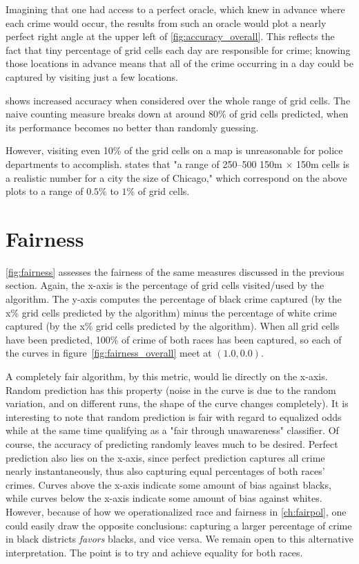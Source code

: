 Imagining that one had access to a perfect oracle, which knew in advance where each crime would occur, the results from such an oracle would plot a nearly perfect right angle at the upper left of \autoref{fig:accuracy_overall}. This reflects the fact that tiny percentage of grid cells each day are responsible for crime; knowing those locations in advance means that all of the crime occurring in a day could be captured by visiting just a few locations.

\pp shows increased accuracy when considered over the whole range of grid cells. The naive counting measure breaks down at around 80\% of grid cells predicted, when its performance becomes no better than randomly guessing.

However, visiting even 10\% of the grid cells on a map is unreasonable for police departments to accomplish. \citet{mohler_marked_2014} states that "a range of 250–500 150m $\times$ 150m cells is a realistic number for a city the size of Chicago," which correspond on the above plots to a range of $0.5\%$ to $1\%$ of grid cells.

\section{Fairness}
\autoref{fig:fairness} assesses the fairness of the same measures discussed in the previous section. Again, the x-axis is the percentage of grid cells visited/used by the algorithm. The y-axis computes the percentage of black crime captured (by the x\% grid cells predicted by the algorithm) minus the percentage of white crime captured (by the x\% grid cells predicted by the algorithm). When all grid cells have been predicted, 100\% of crime of both races has been captured, so each of the curves in figure~\ref{fig:fairness_overall} meet at $(1.0, 0.0)$.

A completely fair algorithm, by this metric, would lie directly on the x-axis. Random prediction has this property (noise in the curve is due to the random variation, and on different runs, the shape of the curve changes completely). It is interesting to note that random prediction is fair with regard to equalized odds while at the same time qualifying as a "fair through unawareness" classifier. Of course, the accuracy of predicting randomly leaves much to be desired. Perfect prediction also lies on the x-axis, since perfect prediction captures all crime nearly instantaneously, thus also capturing equal percentages of both races' crimes. Curves above the x-axis indicate some amount of bias against blacks, while curves below the x-axis indicate some amount of bias against whites. However, because of how we operationalized race and fairness in \autoref{ch:fairpol}, one could easily draw the opposite conclusions: capturing a larger percentage of crime in black districts \emph{favors} blacks, and vice versa. We remain open to this alternative interpretation. The point is to try and achieve equality for both races.

